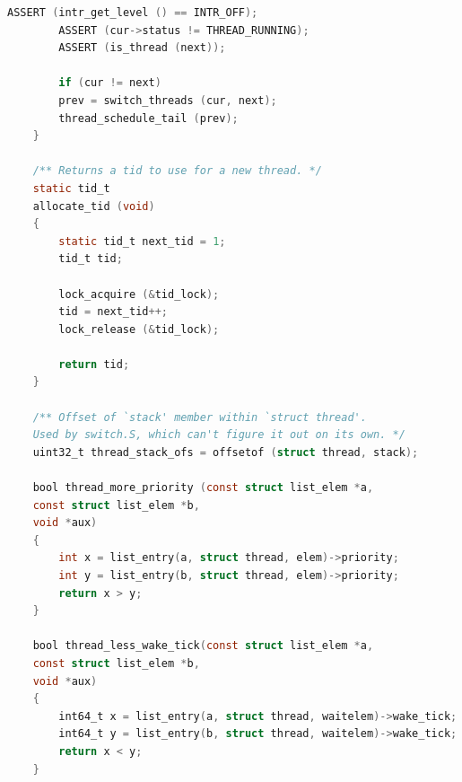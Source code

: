 \documentclass{article}
\begin{document}
\begin{lstlisting}[language=C, title=\texttt{pintos/src/threads/thread.c}]
		ASSERT (intr_get_level () == INTR_OFF);
		ASSERT (cur->status != THREAD_RUNNING);
		ASSERT (is_thread (next));
		
		if (cur != next)
		prev = switch_threads (cur, next);
		thread_schedule_tail (prev);
	}
	
	/** Returns a tid to use for a new thread. */
	static tid_t
	allocate_tid (void) 
	{
		static tid_t next_tid = 1;
		tid_t tid;
		
		lock_acquire (&tid_lock);
		tid = next_tid++;
		lock_release (&tid_lock);
		
		return tid;
	}
	
	/** Offset of `stack' member within `struct thread'.
	Used by switch.S, which can't figure it out on its own. */
	uint32_t thread_stack_ofs = offsetof (struct thread, stack);
	
	bool thread_more_priority (const struct list_elem *a,
	const struct list_elem *b,
	void *aux) 
	{
		int x = list_entry(a, struct thread, elem)->priority;
		int y = list_entry(b, struct thread, elem)->priority;
		return x > y;
	}
	
	bool thread_less_wake_tick(const struct list_elem *a,
	const struct list_elem *b,
	void *aux) 
	{
		int64_t x = list_entry(a, struct thread, waitelem)->wake_tick;
		int64_t y = list_entry(b, struct thread, waitelem)->wake_tick;
		return x < y;
	}
\end{lstlisting}
\end{document}
